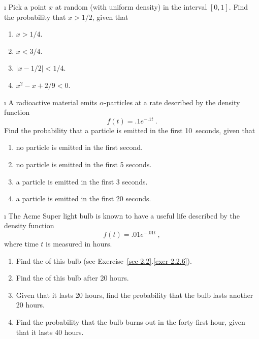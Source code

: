 \exercises
\begin{LJSItem}

\i\label{exer 4.2.1} Pick a point $x$ at random (with uniform density) in the interval
$[0,1]$.  Find the probability that $x > 1/2$, given that
\begin{enumerate}
\item $x > 1/4$.

\item $x < 3/4$.

\item $|x - 1/2| < 1/4$.

\item $x^2 - x + 2/9 < 0$.
\end{enumerate}

\i\label{exer 4.2.2} A radioactive material emits $\alpha$-particles at a rate described by
the density function
$$
f(t) = .1e^{-.1t}\ .
$$
Find the probability
that a particle is emitted in the first 10~seconds, given that
\begin{enumerate}
\item no particle is emitted in the first second.

\item no particle is emitted in the first 5 seconds.

\item a particle is emitted in the first 3 seconds.

\item a particle is emitted in the first 20 seconds.
\end{enumerate}

\i\label{exer 4.2.3} The Acme Super light bulb is known to have a useful life
described by  the density function
$$
f(t) = .01e^{-.01t}\ ,
$$
where time $t$ is measured in hours.  
\begin{enumerate}
\item Find the  of this bulb 
(see Exercise~\ref{sec 2.2}.\ref{exer 2.2.6}).

\item Find the  of this bulb after 20 hours.

\item Given that it lasts 20 hours, find the probability that the bulb lasts another 20
hours.

\item Find the probability that the bulb burns out in the forty-first hour, given
that it lasts 40 hours.
\end{enumerate}


\end{LJSItem}
